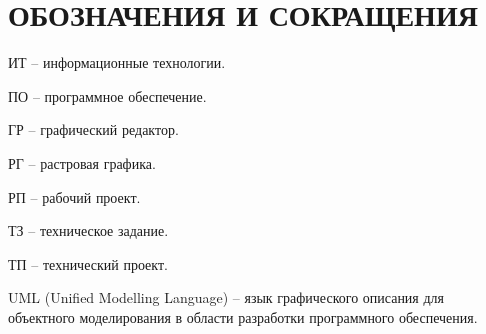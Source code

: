 \section*{ОБОЗНАЧЕНИЯ И СОКРАЩЕНИЯ}

ИТ -- информационные технологии. 

ПО -- программное обеспечение.

ГР -- графический редактор.

РГ -- растровая графика.

РП -- рабочий проект.

ТЗ -- техническое задание.

ТП -- технический проект.

UML (Unified Modelling Language) -- язык графического описания для объектного моделирования в области разработки программного обеспечения.

